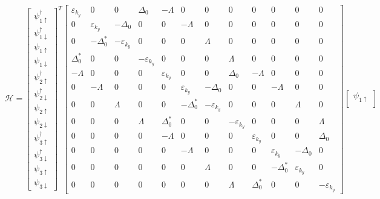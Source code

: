 \documentclass{jarticle}
\begin{document}
	\begin{align}
	\mathcal{H}=
	\begin{bmatrix}
	\psi_{1\uparrow}^\dagger \\ 
	\psi_{1\downarrow}^\dagger \\ 
	\psi_{1\uparrow} \\ 
	\psi_{1\downarrow} \\ 
	\psi_{2\uparrow}^\dagger \\ 
	\psi_{2\downarrow}^\dagger \\ 
	\psi_{2\uparrow} \\ 
	\psi_{2\downarrow} \\ 
	\psi_{3\uparrow}^\dagger \\ 
	\psi_{3\downarrow}^\dagger \\ 
	\psi_{3\uparrow} \\ 
	\psi_{3\downarrow}
	\end{bmatrix} 
	^T
	\begin{bmatrix}
	\varepsilon_{k_y} & 0 & 0 & \Delta_0 & -\Lambda & 0 & 0 & 0 & 0 & 0 & 0 & 0 \\ 
	0 & \varepsilon_{k_y} & -\Delta_0 & 0 & 0 & -\Lambda & 0 & 0 & 0 & 0 & 0 & 0 \\ 
	0 & -\Delta_0^{*} & -\varepsilon_{k_y} & 0 & 0 & 0 & \Lambda & 0 & 0 & 0 & 0 & 0 \\ 
	\Delta_0^{*} & 0 & 0 & -\varepsilon_{k_y} & 0 & 0 & 0 & \Lambda & 0 & 0 & 0 & 0 \\ 
	-\Lambda & 0 & 0 & 0 & \varepsilon_{k_y} & 0 & 0 & \Delta_0 & -\Lambda & 0 & 0 & 0 \\ 
	0 & -\Lambda & 0 & 0 & 0 & \varepsilon_{k_y} & -\Delta_0 & 0 & 0 & -\Lambda & 0 & 0 \\ 
	0 & 0 & \Lambda & 0 & 0 & -\Delta_0^{*} & -\varepsilon_{k_y} & 0 & 0 & 0 & \Lambda & 0 \\ 
	0 & 0 & 0 & \Lambda & \Delta_0^{*} & 0 & 0 & -\varepsilon_{k_y} & 0 & 0 & 0 & \Lambda \\ 
	0 & 0 & 0 & 0 & -\Lambda & 0 & 0 & 0 & \varepsilon_{k_y} & 0 & 0 & \Delta_0 \\ 
	0 & 0 & 0 & 0 & 0 & -\Lambda & 0 & 0 & 0 & \varepsilon_{k_y} & -\Delta_0 & 0 \\ 
	0 & 0 & 0 & 0 & 0 & 0 & \Lambda & 0 & 0 & -\Delta_0^{*} & \varepsilon_{k_y} & 0 \\ 
	0 & 0 & 0 & 0 & 0 & 0 & 0 & \Lambda & \Delta_0^{*} & 0 & 0 & -\varepsilon_{k_y}
	\end{bmatrix} 
	\begin{bmatrix}
	\psi_{1\uparrow} \\ 

\end{bmatrix}
\end{align}
\end{document}
